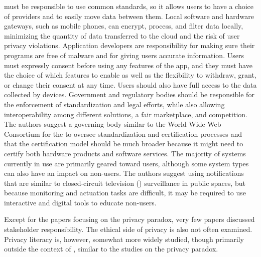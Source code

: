 must be responsible to use common standards, so it allows users to have a choice
of providers and to easily move data between them. Local software and hardware
gateways, such as mobile phones, can encrypt, process, and filter data locally,
minimizing the quantity of data transferred to the cloud and the risk of user
privacy violations. Application developers are responsibility for making sure
their programs are free of malware and for giving users accurate information.
Users must expressly consent before using any features of the app, and they must
have the choice of which features to enable as well as the flexibility to withdraw,
grant, or change their consent at any time. Users should also have full access
to the data collected by \hyperlink{\acronym}{\acronym} devices. Government and regulatory bodies should be
responsible for the enforcement of standardization and legal efforts, while also
allowing interoperability among different \hyperlink{\acronym}{\acronym} solutions, a fair marketplace,
and competition. The authors suggest a governing body similar to the World Wide
Web Consortium for the \hyperlink{\acronym}{\acronym} to oversee standardization and certification processes
and that the \hyperlink{\acronym}{\acronym} certification model should be much broader because it might need
to certify both hardware products and software services.
The majority of \hyperlink{\acronym}{\acronym} systems currently in use are primarily geared toward users,
although some \hyperlink{\acronym}{\acronym} system types can also have an impact on non-users. The authors
suggest using notifications that are similar to closed-circuit television (\hyperlink{\acronym}{\acronym}) surveillance in public spaces,
but because monitoring and actuation tasks are difficult, it may be required to use
interactive and digital tools to educate non-users.

Except for the papers focusing on the privacy paradox, very few papers discussed
stakeholder responsibility. The ethical side of privacy is also not often examined.
Privacy literacy is, however, somewhat more widely studied, though primarily
outside the context of \hyperlink{\acronym}{\acronym}, similar to the studies on the privacy paradox.
